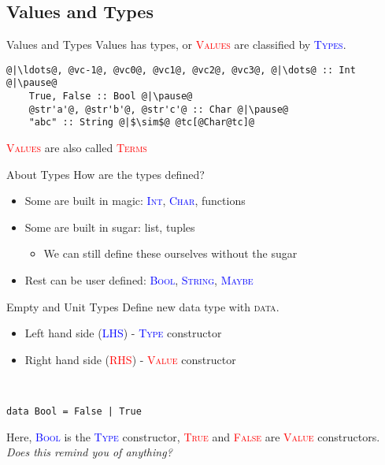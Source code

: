 \documentclass[xcolor={usenames,dvipsnames}]{beamer}
\newcommand{\hkeyword}[1]{\textcolor{TealBlue}{\textsc{#1}}}
\newcommand{\htycon}[1]{\textcolor{Blue}{\textsc{#1}}}
\newcommand{\hvalcon}[1]{\textcolor{Red}{\textsc{#1}}}
\begin{document}
\subsection{Values and Types}

\begin{frame}[fragile]{Values and Types}
  Values has types, or \hvalcon{Values} are classified by \htycon{Types}.\\

  \begin{lstlisting}[style=hask]
    @|\ldots@, @vc-1@, @vc0@, @vc1@, @vc2@, @vc3@, @|\dots@ :: Int @|\pause@
    True, False :: Bool @|\pause@
    @str'a'@, @str'b'@, @str'c'@ :: Char @|\pause@
    "abc" :: String @|$\sim$@ @tc[@Char@tc]@

  \end{lstlisting}

  \tiny{\hvalcon{Values} are also called \hvalcon{Terms}}
\end{frame}

\begin{frame}[fragile]{About Types}
  How are the types defined?\\
  \begin{itemize}
    \item Some are built in magic: \htycon{Int}, \htycon{Char}, functions
    \pause
    \item Some are built in sugar: list, tuples
      \begin{itemize}
        \item We can still define these ourselves without the sugar
      \end{itemize}
    \pause
    \item Rest can be user defined: \htycon{Bool}, \htycon{String}, \htycon{Maybe}
  \end{itemize}
\end{frame}

\begin{frame}[fragile]{Empty and Unit Types}
  Define new data type with \hkeyword{data}.
  \pause
  \begin{itemize}
    \item Left hand side (\htycon{LHS}) - \htycon{Type} constructor
    \pause
    \item Right hand side (\hvalcon{RHS}) - \hvalcon{Value} constructor
    \pause
  \end{itemize}

  \ \\
  \begin{lstlisting}[style=hask]
    data Bool = False | True
  \end{lstlisting}

  Here, \htycon{Bool} is the \htycon{Type} constructor, \hvalcon{True} and \hvalcon{False} are \hvalcon{Value} constructors.\\
  \textit{\tiny{Does this remind you of anything?}}
\end{frame}
\end{document}
